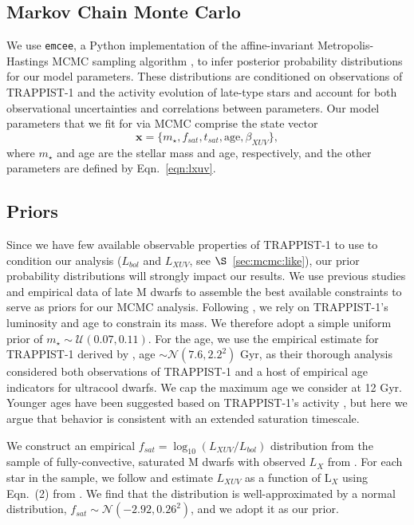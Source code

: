 \documentclass[twocolumn]{aastex62}
\def\gsim{~\rlap{$>$}{\lower 1.0ex\hbox{$\sim$}}}
\begin{document}
\subsection{Markov Chain Monte Carlo} \label{sec:mcmc}

We use \texttt{emcee}, a Python implementation of the affine-invariant Metropolis-Hastings MCMC sampling algorithm \citep{ForemanMackey2013}, to infer posterior probability distributions for our model parameters. These distributions are conditioned on observations of TRAPPIST-1 and the activity evolution of late-type stars and account for both observational uncertainties and correlations between parameters. Our model parameters that we fit for via MCMC comprise the state vector
\begin{equation} \label{eqn:state}
    \textbf{x} = \{m_{\star}, f_{sat}, t_{sat}, \mathrm{age}, \beta_{XUV}\},
\end{equation}
where $m_{\star}$ and age are the stellar mass and age, respectively, and the other parameters are defined by Eqn.~\ref{eqn:lxuv}.

\subsection{Priors} \label{sec:mcmc:priors}

Since we have few available observable properties of TRAPPIST-1 to use to condition our analysis ($L_{bol}$ and $L_{XUV}$, see $\S$~\ref{sec:mcmc:like}), our prior probability distributions will strongly impact our results. We use previous studies and empirical data of late M dwarfs to assemble the best available constraints to serve as priors for our MCMC analysis. Following \citet{vanGrootel2018}, we rely on TRAPPIST-1's luminosity and age to constrain its mass. We therefore adopt a simple uniform prior of $m_{\star} \sim \mathcal{U}(0.07, 0.11)$. For the age, we use the empirical estimate for TRAPPIST-1 derived by \citet{Burgasser2017}, age $\sim \mathcal{N}(7.6, 2.2^2)$ Gyr, as their thorough analysis considered both observations of TRAPPIST-1 and a host of empirical age indicators for ultracool dwarfs. We cap the maximum age we consider at 12 Gyr. Younger ages have been suggested based on TRAPPIST-1's activity \citep[e.g.~$\gsim 500$ Myr,][]{Bourrier2017b}, but here we argue that behavior is consistent with an extended saturation timescale.

We construct an empirical $f_{sat} = \log_{10}(L_{XUV}/L_{bol})$ distribution from the sample of fully-convective, saturated M dwarfs with observed $L_{X}$ from \citet{Wright2011}. For each star in the \citet{Wright2011} sample, we follow \citet{Wheatley2017} and estimate $L_{XUV}$ as a function of L$_{X}$ using Eqn.~(2) from \citet{Chadney2015}. We find that the distribution is well-approximated by a normal distribution, $f_{sat} \sim \mathcal{N}(-2.92, 0.26^2)$, and we adopt it as our prior.  
\end{document}
